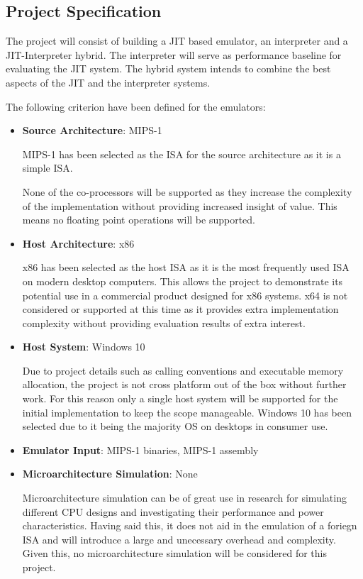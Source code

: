 \subsection{Project Specification}

The project will consist of building a JIT based emulator, an interpreter and a JIT-Interpreter hybrid. The interpreter will serve as performance baseline for evaluating the JIT system. The hybrid system intends to combine the best aspects of the JIT and the interpreter systems.

The following criterion have been defined for the emulators:

\begin{itemize}
    \item \textbf{Source Architecture}: MIPS-1
    
    MIPS-1 has been selected as the ISA for the source architecture as it is a simple ISA. 

    None of the co-processors will be supported as they increase the complexity of the implementation without providing increased insight of value. This means no floating point operations will be supported.
    
    \item \textbf{Host Architecture}: x86
    
    x86 has been selected as the host ISA as it is the most frequently used ISA on modern desktop computers. This allows the project to demonstrate its potential use in a commercial product designed for x86 systems. x64 is not considered or supported at this time as it provides extra implementation complexity without providing evaluation results of extra interest.
    
    \item \textbf{Host System}: Windows 10
    
    Due to project details such as calling conventions and executable memory allocation, the project is not cross platform out of the box without further work. For this reason only a single host system will be supported for the initial implementation to keep the scope manageable. Windows 10 has been selected due to it being the majority OS on desktops in consumer use.
    
    \item \textbf{Emulator Input}: MIPS-1 binaries, MIPS-1 assembly
    \item \textbf{Microarchitecture Simulation}: None
    
    Microarchitecture simulation can be of great use in research for simulating different CPU designs and investigating their performance and power characteristics. Having said this, it does not aid in the emulation of a foriegn ISA and will introduce a large and unecessary overhead and complexity. Given this, no microarchitecture simulation will be considered for this project.
\end{itemize}